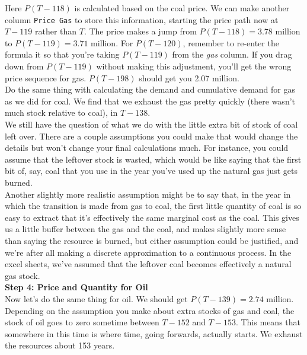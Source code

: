 \begin{enumerate}
\begin{Exercise}
\begin{sol}
        Here $P(T-118)$ is calculated based on the coal price. We can make another column \texttt{Price Gas} to store this information, starting the price path now at $T-119$ rather than $T$. The price makes a jump from $P(T-118)=3.78$ million to $P(T-119)=3.71$ million. For $P(T-120)$, remember to re-enter the formula it so that you're taking $P(T-119)$ from the \textit{gas} column. If you drag down from $P(T-119)$ without making this adjustment, you'll get the wrong price sequence for gas. $P(T-198)$ should get you 2.07 million.\\
        
        Do the same thing with calculating the demand and cumulative demand for gas as we did for coal. We find that we exhaust the gas pretty quickly (there wasn't much stock relative to coal), in $T-138$.\\
        
        We still have the question of what we do with the little extra bit of stock of coal left over. There are a couple assumptions you could make that would change the details but won't change your final calculations much. For instance, you could assume that the leftover stock is wasted, which would be like saying that the first bit of, say, coal that you use in the year you've used up the natural gas just gets burned.\\
        
        Another slightly more realistic assumption might be to say that, in the year in which the transition is made from gas to coal, the first little quantity of coal is so easy to extract that it's effectively the same marginal cost as the coal. This gives us a little buffer between the gas and the coal, and makes slightly more sense than saying the resource is burned, but either assumption could be justified, and we're after all making a discrete approximation to a continuous process. In the excel sheets, we've assumed that the leftover coal becomes effectively a natural gas stock.\\
        
        \textbf{Step 4: Price and Quantity for Oil}\\
        
        Now let's do the same thing for oil. We should get $P(T-139)=2.74$ million. Depending on the assumption you make about extra stocks of gas and coal, the stock of oil goes to zero sometime between $T-152$ and $T-153$. This means that somewhere in this time is where time, going forwards, actually starts. We exhaust the resources about 153 years. \\
        

\end{sol}
\end{Exercise}
\end{enumerate}
